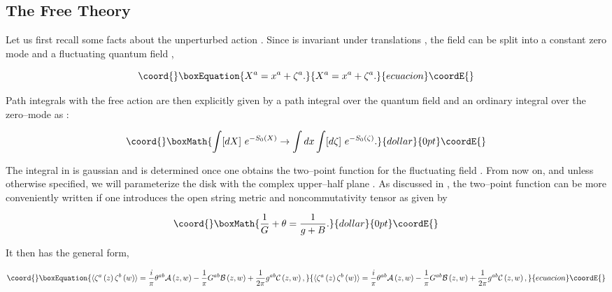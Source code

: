 \documentclass[a4paper,11pt]{article}
\providecommand{\mathbb}[1]{{\bf{#1}}}
\begin{document}
\subsection{The Free Theory}


Let us first recall some facts about the unperturbed action \coordHE{}. Since 
\coordHE{} is invariant under translations \coordHE{}, the
field \coordHE{} can be split into a constant zero mode \coordHE{} and a
fluctuating quantum field \coordHE{},

\begin{equation}\coord{}\boxEquation{
X^{a}=x^{a}+\zeta ^{a}.
\label{split}
}{
X^{a}=x^{a}+\zeta ^{a}.
}{ecuacion}\coordE{}\end{equation}

\noindent
Path integrals with the free action \coordHE{} are then explicitly given by a
path integral over the quantum field \coordHE{} and an ordinary integral
over the zero--mode \coordHE{} as \cite{Fradkin-Tseytlin}:

$$\coord{}\boxMath{
\int [dX]\ e^{-S_{0}\left( X\right) }\rightarrow \int dx \int 
[d\zeta]\ e^{-S_{0}\left( \zeta \right) }.
}{dollar}{0pt}\coordE{}$$

The integral in \myHighlight{$[d\zeta]$}\coordHE{} is gaussian and is determined once one obtains 
the two--point function for the fluctuating field \myHighlight{$\zeta$}\coordHE{}. From now on, 
and unless otherwise specified, we will parameterize the disk \myHighlight{$\Sigma$}\coordHE{} with 
the complex upper--half plane \myHighlight{$\mathbb{H}^{+}$}\coordHE{}. As discussed in \cite{ACNY, 
Schomerus, Seiberg-Witten}, the two--point function can be more 
conveniently written if one introduces the open string metric \coordHE{} and 
noncommutativity tensor \coordHE{} as given by

$$\coord{}\boxMath{
\frac{1}{G}+\theta =\frac{1}{g+B}.
}{dollar}{0pt}\coordE{}$$

\noindent
It then has the general form,

\begin{equation}\coord{}\boxEquation{
\langle \zeta^{a} \left( z\right) \zeta^{b} \left( w\right) \rangle = 
\frac{i}{\pi} \theta^{ab} \mathcal{A}\left( z,w\right) - 
\frac{1}{\pi} G^{ab} \mathcal{B}\left( z,w\right) + 
\frac{1}{2\pi} g^{ab} \mathcal{C}\left( z,w\right) ,
\label{prop}
}{
\langle \zeta^{a} \left( z\right) \zeta^{b} \left( w\right) \rangle = 
\frac{i}{\pi} \theta^{ab} \mathcal{A}\left( z,w\right) - 
\frac{1}{\pi} G^{ab} \mathcal{B}\left( z,w\right) + 
\frac{1}{2\pi} g^{ab} \mathcal{C}\left( z,w\right) ,
}{ecuacion}\coordE{}\end{equation}
\end{document}
